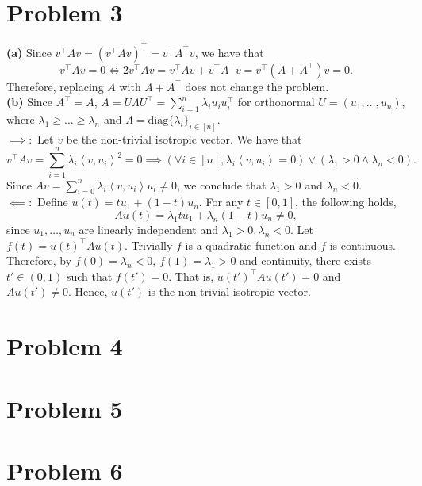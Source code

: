 \documentclass[11pt]{article}
\theoremstyle{plain}
\theoremstyle{definition}
\theoremstyle{remark}
\newcommand{\diag}{\mathrm{diag}}
\newcommand{\inner}[2]{\left\langle #1,#2\right\rangle}
\begin{document}
\section*{Problem 3}
\textbf{(a)}
Since $v^\top A v = (v^\top A v)^\top = v^\top A^\top v$, we have that
$$
   v^\top A v = 0 \iff 2v^\top A v = v^\top A v + v^\top A^\top v = v^\top(A+A^\top)v = 0.
$$
Therefore, replacing $A$ with $A+A^\top$ does not change the problem.
\\\textbf{(b)}
Since $A^\top = A$, $A = U\Lambda U^\top = \sum_{i=1}^n \lambda_i u_iu_i^\top$ for orthonormal $U = (u_1,\ldots,u_n)$, where $\lambda_1\geq \ldots \geq \lambda_n$ and $\Lambda = \diag\{\lambda_i\}_{i\in[n]}$.
\\$\implies:$ Let $v$ be the non-trivial isotropic vector.
We have that 
$$
    v^\top Av = \sum_{i=1}^n \lambda_i \inner{v}{u_i}^2 = 0\implies (\forall i\in[n], \lambda_i\inner{v}{u_i}=0)\lor (\lambda_1 > 0\land \lambda_n < 0).
$$
Since $Av = \sum_{i=0}^n \lambda_i\inner{v}{u_i}u_i \neq 0$, we conclude that $\lambda_1 > 0$ and $\lambda_n < 0$.
\\$\impliedby:$ Define $u(t) = tu_1 + (1-t)u_n$.
For any $t\in[0,1]$, the following holds,
$$
    Au(t) = \lambda_1 tu_1 + \lambda_n(1-t)u_n \neq 0,
$$
since $u_1,\ldots,u_n$ are linearly independent and $\lambda_1 > 0,\lambda_n < 0$.
Let $f(t) = u(t)^\top A u(t)$.
Trivially $f$ is a quadratic function and $f$ is continuous.
Therefore, by $f(0) = \lambda_n < 0$, $f(1) = \lambda_1 > 0$ and continuity, there exists $t' \in (0,1)$ such that $f(t') = 0$.
That is, $u(t')^\top Au(t') = 0$ and $Au(t') \neq 0$.
Hence, $u(t')$ is the non-trivial isotropic vector.

\section*{Problem 4}
\section*{Problem 5}
\section*{Problem 6}
\end{document}
